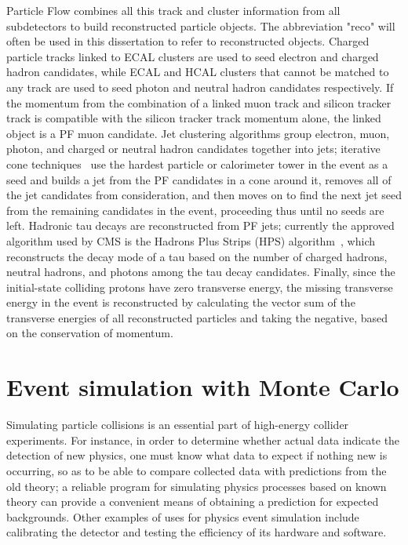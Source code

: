 Particle Flow combines all this track and cluster information from all subdetectors to build reconstructed particle objects. The abbreviation "reco" will often be used in this dissertation to refer to reconstructed objects. Charged particle tracks linked to ECAL clusters are used to seed electron and charged hadron candidates, while ECAL and HCAL clusters that cannot be matched to any track are used to seed photon and neutral hadron candidates respectively. If the momentum from the combination of a linked muon track and silicon tracker track is compatible with the silicon tracker track momentum alone, the linked object is a PF muon candidate. Jet clustering algorithms group electron, muon, photon, and charged or neutral hadron candidates together into jets; iterative cone techniques~\cite{1126-6708-2008-04-063} use the hardest particle or calorimeter tower in the event as a seed and builds a jet from the PF candidates in a cone around it, removes all of the jet candidates from consideration, and then moves on to find the next jet seed from the remaining candidates in the event, proceeding thus until no seeds are left. Hadronic tau decays are reconstructed from PF jets; currently the approved algorithm used by CMS is the Hadrons Plus Strips (HPS) algorithm~\cite{CMS:2011msa}, which reconstructs the decay mode of a tau based on the number of charged hadrons, neutral hadrons, and photons among the tau decay candidates. Finally, since the initial-state colliding protons have zero transverse energy, the missing transverse energy in the event is reconstructed by calculating the vector sum of the transverse energies of all reconstructed particles and taking the negative, based on the conservation of momentum.

\section{Event simulation with Monte Carlo\label{sec:cms-sim}}

Simulating particle collisions is an essential part of high-energy collider experiments. For instance, in order to determine whether actual data indicate the detection of new physics, one must know what data to expect if nothing new is occurring, so as to be able to compare collected data with predictions from the old theory; a reliable program for simulating physics processes based on known theory can provide a convenient means of obtaining a prediction for expected backgrounds. Other examples of uses for physics event simulation include calibrating the detector and testing the efficiency of its hardware and software.

